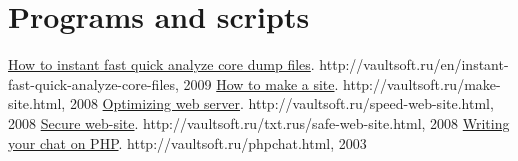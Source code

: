 \documentclass[10pt,a4paper]{moderncv}
\begin{document}
  \section{Programs and scripts}
      
        \cvlistitem{}

      
  \begin{thebibliography}{9}
    
      \bibitem{}
    \href{http://vaultsoft.ru/en/instant-fast-quick-analyze-core-files}{How to instant fast quick analyze core dump files}. http://vaultsoft.ru/en/instant-fast-quick-analyze-core-files, 2009
    \bibitem{}
    \href{http://vaultsoft.ru/make-site.html}{How to make a site}. http://vaultsoft.ru/make-site.html, 2008
    \bibitem{}
    \href{http://vaultsoft.ru/speed-web-site.html}{Optimizing web server}. http://vaultsoft.ru/speed-web-site.html, 2008
    \bibitem{}
    \href{http://vaultsoft.ru/txt.rus/safe-web-site.html}{Secure web-site}. http://vaultsoft.ru/txt.rus/safe-web-site.html, 2008
    \bibitem{}
    \href{http://vaultsoft.ru/phpchat.html}{Writing your chat on PHP}. http://vaultsoft.ru/phpchat.html, 2003
  
  \end{thebibliography}
  
\end{document}
